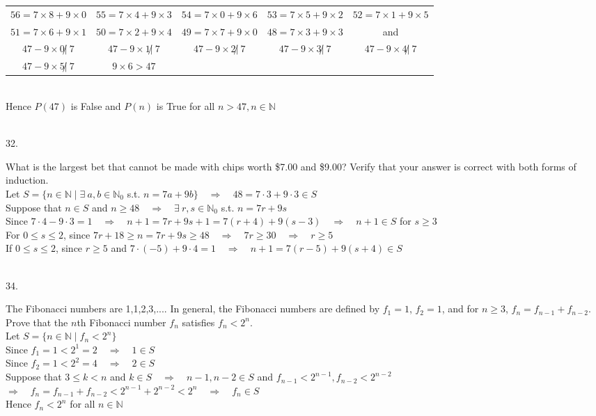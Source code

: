 \documentclass[12pt]{book}
\begin{document}
\begin{CJK}{UTF8}{bsmi}
\begin{minipage}[t]{\dimexpr\linewidth-2em}
\begin{tabular}[t]{ccccc}
    $56=7\times8+9\times0$ & $55=7\times4+9\times3$ & $54=7\times0+9\times6$ & $53=7\times5+9\times2$ &
    $52=7\times1+9\times5$ \\
    $51=7\times6+9\times1$ & $50=7\times2+9\times4$ &
    $49=7\times7+9\times0$ & $48=7\times3+9\times3$ &
    and \\
    $47-9\times0\not|\ 7$ & $47-9\times1\not|\ 7$ &
    $47-9\times2\not|\ 7$ & $47-9\times3\not|\ 7$ &
    $47-9\times4\not|\ 7$ \\
    $47-9\times5\not|\ 7$ & $9\times6>47$
\end{tabular} \\
Hence $P(47)$ is False and $P(n)$ is True for all $n>47, n\in\mathbb{N}$
\end{minipage}\\[5pt]

32. \begin{minipage}[t]{\dimexpr\linewidth-2em}
What is the largest bet that cannot be made with chips worth \$7.00 and \$9.00? Verify that your answer is correct with both forms of induction. \\
Let $S=\{n\in\mathbb{N}\mid\exists\ a, b\in\mathbb{N}_0$ s.t. $n=7a+9b\}\quad\Rightarrow\quad 48=7\cdot3+9\cdot3\in S$\\
Suppose that $n\in S$ and $n\ge48\quad\Rightarrow\quad\exists\ r,s\in\mathbb{N}_0$ s.t. $n=7r+9s$ \\
Since $7\cdot4-9\cdot3=1\quad\Rightarrow\quad n+1=7r+9s+1=7(r+4)+9(s-3)\quad\Rightarrow\quad n+1\in S$ for $s\ge3$ \\
For $0\le s\le 2$, since $7r+18\ge n=7r+9s\ge48\quad\Rightarrow\quad 7r\ge30\quad\Rightarrow\quad r\ge5$ \\
If $0\le s\le 2$, since $r\ge5$ and $7\cdot(-5)+9\cdot4=1\quad\Rightarrow\quad n+1=7(r-5)+9(s+4)\in S$
\end{minipage}\\

34. \begin{minipage}[t]{\dimexpr\linewidth-2em}
The Fibonacci numbers are 1,1,2,3,.... In general, the Fibonacci numbers are defined by $f_1=1$, $f_2=1$, and for $n\ge3$, $f_n=f_{n-1}+f_{n-2}$. Prove that the $n$th Fibonacci number $f_n$ satisfies $f_n<2^n$. \\
Let $S=\{n\in\mathbb{N}\mid f_n<2^n\}$ \\
Since $f_1=1<2^1=2\quad\Rightarrow\quad 1\in S$ \\
Since $f_2=1<2^2=4\quad\Rightarrow\quad 2\in S$ \\
Suppose that $3\le k<n$ and $k\in S\quad\Rightarrow\quad n-1, n-2\in S$ and $f_{n-1}<2^{n-1}, f_{n-2}<2^{n-2}$ \\
$\Rightarrow\quad f_n=f_{n-1}+f_{n-2}<2^{n-1}+2^{n-2}<2^n\quad\Rightarrow\quad f_n\in S$ \\
Hence $f_n<2^n$ for all $n\in\mathbb{N}$
\end{minipage}\\

\end{CJK}
\end{document}
